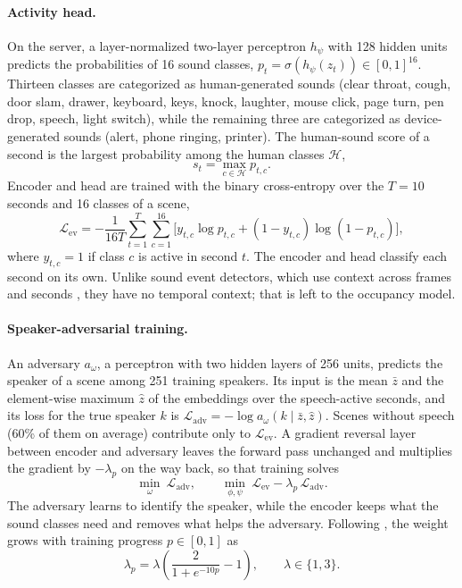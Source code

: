 \documentclass[11pt]{article}
\begin{document}
\paragraph{Activity head.} On the server, a layer-normalized two-layer perceptron $h_\psi$ with 128 hidden units predicts the probabilities of 16 sound classes, $p_t = \sigma(h_\psi(z_t)) \in [0,1]^{16}$. Thirteen classes are categorized as human-generated sounds (clear throat, cough, door slam, drawer, keyboard, keys, knock, laughter, mouse click, page turn, pen drop, speech, light switch), while the remaining three are categorized as device-generated sounds (alert, phone ringing, printer). The human-sound score of a second is the largest probability among the human classes $\mathcal{H}$,
\begin{equation}
s_t = \max_{c \in \mathcal{H}} p_{t,c}.
\label{eq:score}
\end{equation}
Encoder and head are trained with the binary cross-entropy over the $T=10$ seconds and 16 classes of a scene,
\begin{equation}
\mathcal{L}_{\mathrm{ev}} = -\frac{1}{16T} \sum_{t=1}^{T}\sum_{c=1}^{16} \Big[ y_{t,c}\log p_{t,c} + (1-y_{t,c})\log(1-p_{t,c}) \Big],
\label{eq:bce}
\end{equation}
where $y_{t,c}=1$ if class $c$ is active in second $t$. The encoder and head classify each second on its own. Unlike sound event detectors, which use context across frames and seconds \citep{cakir2017crnn}, they have no temporal context; that is left to the occupancy model.

\paragraph{Speaker-adversarial training.} An adversary $a_\omega$, a perceptron with two hidden layers of 256 units, predicts the speaker of a scene among 251 training speakers. Its input is the mean $\bar z$ and the element-wise maximum $\hat z$ of the embeddings over the speech-active seconds, and its loss for the true speaker $k$ is $\mathcal{L}_{\mathrm{adv}} = -\log a_\omega(k \mid \bar z, \hat z)$. Scenes without speech (60\% of them on average) contribute only to $\mathcal{L}_{\mathrm{ev}}$. A gradient reversal layer \citep{ganin2015grl} between encoder and adversary leaves the forward pass unchanged and multiplies the gradient by $-\lambda_p$ on the way back, so that training solves
\begin{equation}
\min_{\omega}\ \mathcal{L}_{\mathrm{adv}}, \qquad \min_{\phi,\psi}\ \mathcal{L}_{\mathrm{ev}} - \lambda_p\,\mathcal{L}_{\mathrm{adv}}.
\label{eq:adv}
\end{equation}
The adversary learns to identify the speaker, while the encoder keeps what the sound classes need and removes what helps the adversary. Following \citet{ganin2015grl}, the weight grows with training progress $p \in [0,1]$ as
\begin{equation}
\lambda_p = \lambda \left( \frac{2}{1+e^{-10p}} - 1 \right), \qquad \lambda \in \{1, 3\}.
\label{eq:lambda}
\end{equation}
\end{document}
